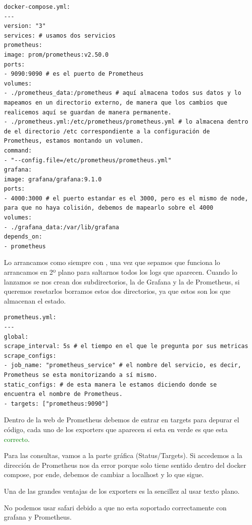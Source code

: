\begin{lstlisting}[style=yamlstyle]
  docker-compose.yml:
---
version: "3"
services: # usamos dos servicios
prometheus:
image: prom/prometheus:v2.50.0
ports:
- 9090:9090 # es el puerto de Prometheus
volumes:
- ./prometheus_data:/prometheus # aquí almacena todos sus datos y lo mapeamos en un directorio externo, de manera que los cambios que realicemos aquí se guardan de manera permanente.
- ./prometheus.yml:/etc/prometheus/prometheus.yml # lo almacena dentro de el directorio /etc correspondiente a la configuración de Prometheus, estamos montando un volumen.
command:
- "--config.file=/etc/prometheus/prometheus.yml"
grafana:
image: grafana/grafana:9.1.0
ports:
- 4000:3000 # el puerto estandar es el 3000, pero es el mismo de node, para que no haya colisión, debemos de mapearlo sobre el 4000
volumes:
- ./grafana_data:/var/lib/grafana
depends_on:
- prometheus
\end{lstlisting}

Lo arrancamos como siempre con , una vez que sepamos que funciona lo arrancamos en 2º plano para saltarnos todos los logs que aparecen. Cuando lo lanzamos se nos crean dos subdirectorios, la de Grafana y la de Prometheus, si queremos resetarlos borramos estos dos directorios, ya que estos son los que almacenan el estado.

\begin{lstlisting}[style=yamlstyle]
  prometheus.yml:
---
global:
scrape_interval: 5s # el tiempo en el que le pregunta por sus metricas
scrape_configs:
- job_name: "prometheus_service" # el nombre del servicio, es decir, Prometheus se esta monitorizando a sí mismo.
static_configs: # de esta manera le estamos diciendo donde se encuentra el nombre de Prometheus.
- targets: ["prometheus:9090"]
\end{lstlisting}

Dentro de la web de Prometheus debemos de entrar en targets para depurar el código, cada uno de los exporters que aparecen si esta en verde es que esta \textcolor{green}{correcto}.

Para las consultas, vamos a la parte gráfica (Status/Targets). Si accedemos a la dirección de Prometheus nos da error porque solo tiene sentido dentro del docker compose, por ende, debemos de cambiar a localhost y lo que sigue.

Una de las grandes ventajas de los exporters es la sencillez al usar texto plano.

No podemos usar safari debido a que no esta soportado correctamente con grafana y Prometheus.

